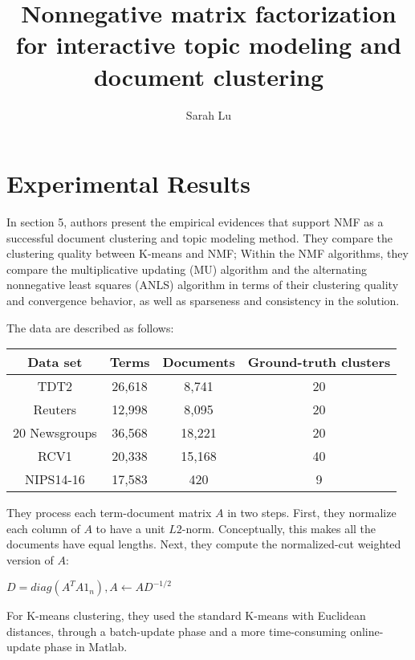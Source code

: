 \documentclass[11pt, oneside]{article}   	%
\title{Nonnegative matrix factorization for interactive topic modeling and document clustering}
\author{Sarah Lu}
\begin{document}
\maketitle
\section{Experimental Results}
\begin{Large}
In section 5, authors  present the empirical evidences that support NMF as a successful document clustering and topic modeling method. They compare the clustering quality between K-means and NMF; Within the NMF algorithms, they compare the multiplicative updating (MU) algorithm and the alternating nonnegative least squares (ANLS) algorithm in terms of their clustering quality and convergence behavior, as well as sparseness and consistency in the solution.  

The data are described as follows:
\begin{center}
 \begin{tabular}{||c c c c||} 
 \hline
 Data set & Terms & Documents & Ground-truth clusters \\ [0.5ex] 
 \hline\hline
 TDT2 & 26,618 & 8,741 & 20 \\ 
 \hline
 Reuters & 12,998 & 8,095 & 20 \\
 \hline
 20 Newsgroups & 36,568 & 18,221 & 20 \\
 \hline
 RCV1 & 20,338 & 15,168 & 40 \\
 \hline
 NIPS14-16 & 17,583 & 420 & 9 \\ [1ex] 
 \hline
\end{tabular}
\end{center}

They  process each term-document matrix $A$ in two steps. First, they normalize each column of $A$ to have a unit $L2$-norm. Conceptually, this makes all the documents have equal lengths. Next, they compute the normalized-cut weighted version of $A$:
\begin{center}
$D = diag(A^{T}A1_n), A\leftarrow AD^{-1/2}$
\end{center}

For K-means clustering, they used the standard K-means with Euclidean distances, through a batch-update phase and a more time-consuming online-update phase in Matlab.


\end{Large}
\end{document}

